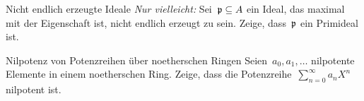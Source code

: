 \documentclass[entwurf]{uebblatt}
\begin{document}

\begin{aufgabe}{}{Nicht endlich erzeugte Ideale}
\emph{Nur vielleicht:}
Sei~$\mathfrak{p} \subseteq A$ ein Ideal, das maximal mit der Eigenschaft ist, nicht
endlich erzeugt zu sein. Zeige, dass~$\mathfrak{p}$ ein Primideal ist.
\end{aufgabe}

\begin{aufgabe}{}{Nilpotenz von Potenzreihen über noetherschen Ringen}
Seien~$a_0, a_1, \ldots$ nilpotente Elemente in einem noetherschen Ring. Zeige,
dass die Potenzreihe~$\sum_{n=0}^\infty a_n X^n$ nilpotent ist.
\end{aufgabe}
\end{document}
